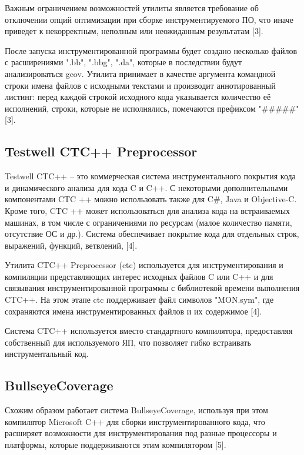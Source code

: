Важным ограничением возможностей утилиты является требование об отключении опций оптимизации при сборке инструментируемого ПО, что иначе приведет к некорректным, неполным или неожиданным результатам [3].

После запуска инструментированной программы будет создано несколько файлов с расширениями ".bb", ".bbg", ".da", которые в последствии будут анализироваться gcov. Утилита принимает в качестве аргумента командной строки имена файлов с исходными текстами и производит аннотированный листинг: перед каждой строкой исходного кода указывается количество её исполнений, строки, которые не исполнялись, помечаются префиксом "\#\#\#\#\#" [3].

\subsection{Testwell CTC++ Preprocessor}
Testwell CTC++ -- это коммерческая система инструментального покрытия кода и динамического анализа для кода C и C++. С некоторыми дополнительными компонентами CTC ++ можно использовать также для C\#, Java и Objective-C. Кроме того, CTC ++ может использоваться для анализа кода на встраиваемых машинах, в том числе с ограничениями по ресурсам (малое количество памяти, отсутствие ОС и др.). Система обеспечивает покрытие кода для отдельных строк, выражений, функций, ветвлений, [4].

Утилита CTC++ Preprocessor (ctc) используется для инструментирования и компиляции представляющих интерес исходных файлов C или C++ и для связывания инструментированной программы с библиотекой времени выполнения CTC++. На этом этапе ctc поддерживает файл символов "MON.sym", где сохраняются имена инструментированных файлов и их содержимое [4].

Система CTC++ используется вместо стандартного компилятора, предоставляя собственный для используемого ЯП, что позволяет гибко встраивать инструментальный код.

\subsection{BullseyeCoverage}
Схожим образом работает система BullseyeCoverage, используя при этом компилятор Microsoft C++ для сборки инструментированного кода, что расширяет возможности для инструментирования под разные процессоры и платформы, которые поддерживаются этим компилятором [5].


